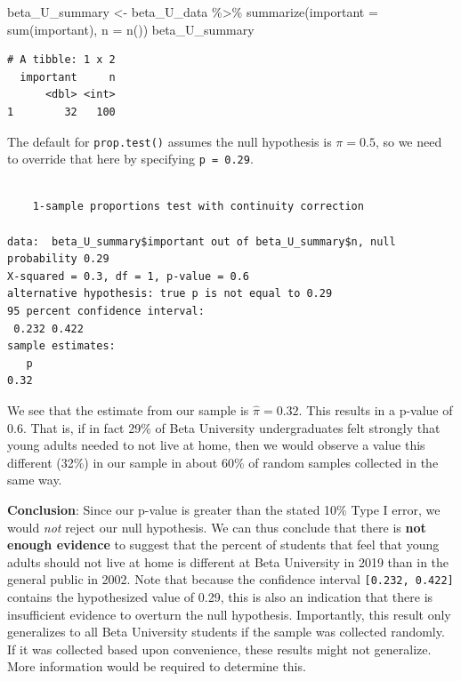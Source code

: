 \documentclass[
  letterpaper,
  DIV=11,
  numbers=noendperiod]{scrreprt}
\newenvironment{Shaded}{\begin{snugshade}}{\end{snugshade}}
\newcommand{\AttributeTok}[1]{\textcolor[rgb]{0.40,0.45,0.13}{#1}}
\newcommand{\FloatTok}[1]{\textcolor[rgb]{0.68,0.00,0.00}{#1}}
\newcommand{\FunctionTok}[1]{\textcolor[rgb]{0.28,0.35,0.67}{#1}}
\newcommand{\NormalTok}[1]{\textcolor[rgb]{0.00,0.23,0.31}{#1}}
\newcommand{\OtherTok}[1]{\textcolor[rgb]{0.00,0.23,0.31}{#1}}
\newcommand{\SpecialCharTok}[1]{\textcolor[rgb]{0.37,0.37,0.37}{#1}}
\theoremstyle{definition}
\theoremstyle{remark}
\begin{document}
\begin{Shaded}
\begin{Highlighting}[]
\NormalTok{beta\_U\_summary }\OtherTok{\textless{}{-}}\NormalTok{ beta\_U\_data }\SpecialCharTok{\%\textgreater{}\%} 
  \FunctionTok{summarize}\NormalTok{(}\AttributeTok{important =} \FunctionTok{sum}\NormalTok{(important),}
            \AttributeTok{n =} \FunctionTok{n}\NormalTok{())}
\NormalTok{beta\_U\_summary}
\end{Highlighting}
\end{Shaded}

\begin{verbatim}
# A tibble: 1 x 2
  important     n
      <dbl> <int>
1        32   100
\end{verbatim}

The default for \texttt{prop.test()} assumes the null hypothesis is
\(\pi = 0.5\), so we need to override that here by specifying
\texttt{p\ =\ 0.29}.

\begin{Shaded}
\end{Shaded}

\begin{verbatim}

    1-sample proportions test with continuity correction

data:  beta_U_summary$important out of beta_U_summary$n, null probability 0.29
X-squared = 0.3, df = 1, p-value = 0.6
alternative hypothesis: true p is not equal to 0.29
95 percent confidence interval:
 0.232 0.422
sample estimates:
   p 
0.32 
\end{verbatim}

We see that the estimate from our sample is \(\hat{\pi} = 0.32\). This
results in a p-value of \(0.6\). That is, if in fact 29\% of Beta
University undergraduates felt strongly that young adults needed to not
live at home, then we would observe a value this different (32\%) in our
sample in about 60\% of random samples collected in the same way.

\textbf{Conclusion}: Since our p-value is greater than the stated 10\%
Type I error, we would \emph{not} reject our null hypothesis. We can
thus conclude that there is \textbf{not enough evidence} to suggest that
the percent of students that feel that young adults should not live at
home is different at Beta University in 2019 than in the general public
in 2002. Note that because the confidence interval
\texttt{{[}0.232,\ 0.422{]}} contains the hypothesized value of 0.29,
this is also an indication that there is insufficient evidence to
overturn the null hypothesis. Importantly, this result only generalizes
to all Beta University students if the sample was collected randomly. If
it was collected based upon convenience, these results might not
generalize. More information would be required to determine this.
\end{document}
